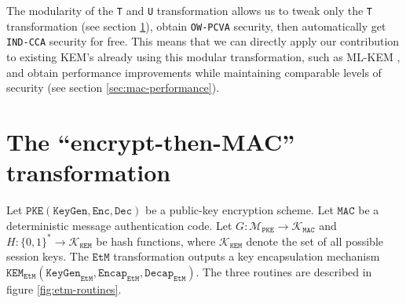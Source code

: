 \documentclass[floatrow,journal=tches,submission]{iacrtrans}
\newcommand{\pke}{\texttt{PKE}}
\newcommand{\keygen}{\texttt{KeyGen}}
\newcommand{\encrypt}{\texttt{Enc}}
\newcommand{\decrypt}{\texttt{Dec}}
\newcommand{\kem}{\texttt{KEM}}
\newcommand{\encap}{\texttt{Encap}}
\newcommand{\decap}{\texttt{Decap}}
\newcommand{\etm}{\texttt{EtM}}  %
\newcommand{\mac}{\texttt{MAC}}
\begin{document}
The modularity of the \texttt{T} and \texttt{U} transformation allows us to tweak only the \texttt{T} transformation (see section \ref{sec:main-results}), obtain \texttt{OW-PCVA} security, then automatically get \texttt{IND-CCA} security for free. This means that we can directly apply our contribution to existing KEM's already using this modular transformation, such as ML-KEM \cite{key2023mechanism}, and obtain performance improvements while maintaining comparable levels of security (see section \ref{sec:mac-performance}).

\section{The ``encrypt-then-MAC'' transformation}\label{sec:main-results}
Let $\pke(\keygen, \encrypt, \decrypt)$ be a public-key encryption scheme. Let $\mac$ be a deterministic message authentication code. Let $G: \mathcal{M}_\pke \rightarrow \mathcal{K}_\mac$ and $H: \{0,1\}^\ast \rightarrow \mathcal{K}_\kem$ be hash functions, where $\mathcal{K}_\kem$ denote the set of all possible session keys. The $\etm$ transformation outputs a key encapsulation mechanism $\kem_\etm(\keygen_\etm, \encap_\etm, \decap_\etm)$. The three routines are described in figure \ref{fig:etm-routines}.
\end{document}
